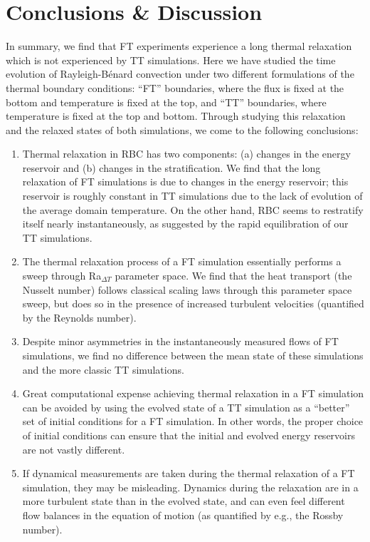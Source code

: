 \documentclass[aps, pre, onecolumn, nofootinbib, notitlepage, groupedaddress, amsfonts, amssymb, amsmath, longbibliography, superscriptaddress]{revtex4-1}
\newcommand{\RB}{Rayleigh-B\'{e}nard }
\begin{document}

\section{Conclusions \& Discussion}
\label{sec:discussion}
In summary, we find that FT experiments experience a long thermal relaxation which is not experienced by TT simulations.
Here we have studied the time evolution of \RB convection under two different formulations of the thermal boundary conditions: ``FT'' boundaries, where the flux is fixed at the bottom and temperature is fixed at the top, and ``TT'' boundaries, where temperature is fixed at the top and bottom.
Through studying this relaxation and the relaxed states of both simulations, we come to the following conclusions:
\begin{enumerate}
\item Thermal relaxation in RBC has two components: (a) changes in the energy reservoir and (b) changes in the stratification.
We find that the long relaxation of FT simulations is due to changes in the energy reservoir; this reservoir is roughly constant in TT simulations due to the lack of evolution of the average domain temperature.
On the other hand, RBC seems to restratify itself nearly instantaneously, as suggested by the rapid equilibration of our TT simulations.
\item The thermal relaxation process of a FT simulation essentially performs a sweep through Ra$_{\Delta T}$ parameter space.
We find that the heat transport (the Nusselt number) follows classical scaling laws through this parameter space sweep, but does so in the presence of increased turbulent velocities (quantified by the Reynolds number).
\item Despite minor asymmetries in the instantaneously measured flows of FT simulations, we find no difference between the mean state of these simulations and the more classic TT simulations.
\item Great computational expense achieving thermal relaxation in a FT simulation can be avoided by using the evolved state of a TT simulation as a ``better'' set of initial conditions for a FT simulation.
In other words, the proper choice of initial conditions can ensure that the initial and evolved energy reservoirs are not vastly different.
\item If dynamical measurements are taken during the thermal relaxation of a FT simulation, they may be misleading.
Dynamics during the relaxation are in a more turbulent state than in the evolved state, and can even feel different flow balances in the equation of motion (as quantified by e.g., the Rossby number).
\end{enumerate}
\end{document}
